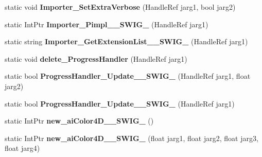 \begin{DoxyCompactItemize}
\item 
\hypertarget{class_assimp_p_i_n_v_o_k_e_a0c946b787c9e17cf79b2568c5ab0b05f}{static void {\bfseries Importer\+\_\+\+Set\+Extra\+Verbose} (Handle\+Ref jarg1, bool jarg2)}\label{class_assimp_p_i_n_v_o_k_e_a0c946b787c9e17cf79b2568c5ab0b05f}

\item 
\hypertarget{class_assimp_p_i_n_v_o_k_e_a54c9d51671dcbe5fc82e7666861a0d3a}{static Int\+Ptr {\bfseries Importer\+\_\+\+Pimpl\+\_\+\+\_\+\+S\+W\+I\+G\+\_} (Handle\+Ref jarg1)}\label{class_assimp_p_i_n_v_o_k_e_a54c9d51671dcbe5fc82e7666861a0d3a}

\item 
\hypertarget{class_assimp_p_i_n_v_o_k_e_a63df43864e06bc9c4dff3ee229b01c97}{static string {\bfseries Importer\+\_\+\+Get\+Extension\+List\+\_\+\+\_\+\+S\+W\+I\+G\+\_} (Handle\+Ref jarg1)}\label{class_assimp_p_i_n_v_o_k_e_a63df43864e06bc9c4dff3ee229b01c97}

\item 
\hypertarget{class_assimp_p_i_n_v_o_k_e_a808e65fa42b65cb49c4a038fd15622d5}{static void {\bfseries delete\+\_\+\+Progress\+Handler} (Handle\+Ref jarg1)}\label{class_assimp_p_i_n_v_o_k_e_a808e65fa42b65cb49c4a038fd15622d5}

\item 
\hypertarget{class_assimp_p_i_n_v_o_k_e_af1f70a57e73a5f60ed444907164b4d61}{static bool {\bfseries Progress\+Handler\+\_\+\+Update\+\_\+\+\_\+\+S\+W\+I\+G\+\_} (Handle\+Ref jarg1, float jarg2)}\label{class_assimp_p_i_n_v_o_k_e_af1f70a57e73a5f60ed444907164b4d61}

\item 
\hypertarget{class_assimp_p_i_n_v_o_k_e_ab8d7200b17333e15540e4469ca60e924}{static bool {\bfseries Progress\+Handler\+\_\+\+Update\+\_\+\+\_\+\+S\+W\+I\+G\+\_} (Handle\+Ref jarg1)}\label{class_assimp_p_i_n_v_o_k_e_ab8d7200b17333e15540e4469ca60e924}

\item 
\hypertarget{class_assimp_p_i_n_v_o_k_e_a7c1475d118e7a80f21694f2935e35db3}{static Int\+Ptr {\bfseries new\+\_\+ai\+Color4\+D\+\_\+\+\_\+\+S\+W\+I\+G\+\_} ()}\label{class_assimp_p_i_n_v_o_k_e_a7c1475d118e7a80f21694f2935e35db3}

\item 
\hypertarget{class_assimp_p_i_n_v_o_k_e_a0505136490d87523a328db04d00d200c}{static Int\+Ptr {\bfseries new\+\_\+ai\+Color4\+D\+\_\+\+\_\+\+S\+W\+I\+G\+\_} (float jarg1, float jarg2, float jarg3, float jarg4)}\label{class_assimp_p_i_n_v_o_k_e_a0505136490d87523a328db04d00d200c}


\end{DoxyCompactItemize}
